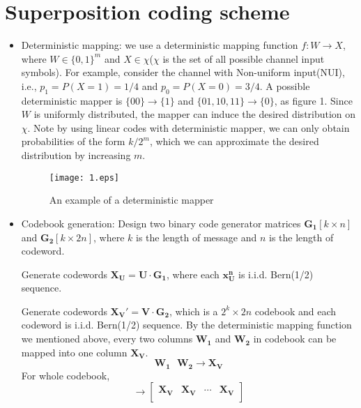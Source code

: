 \documentclass[12]{article}
\begin{document}
\section*{Superposition coding scheme}
\begin{itemize}
	\item Deterministic mapping: we use a deterministic mapping function $f: W\rightarrow X$, 
		where $W\in\{0,1\}^m$ and $X
\in\chi$($\chi$ is the set of all possible channel input symbols). For example, consider the channel with Non-uniform
input(NUI), i.e., $p_1=P(X=1)=1/4$ and $p_0=P(X=0)=3/4$. A possible deterministic mapper is
$\{00\}\rightarrow\{1\}$ and $\{01,10,11\} \rightarrow\{0\}$, as figure 1. Since $W$ is uniformly
distributed, the mapper can induce the desired distribution on $\chi$.
Note by using linear codes with deterministic mapper, we can only obtain probabilities of the form $k/2^m$, which we can
approximate the desired distribution by increasing $m$.\\
  \begin{figure}
\centering
  \texttt{[image: 1.eps]}
 \caption{An example of a deterministic mapper}
\label{1}
\end{figure}
\item Codebook generation: Design two binary code generator matrices $\mathbf{G_1}[k\times n]$ and
$\mathbf{G_2}[k\times 2n]$, where $k$ is the length of message and $n$ is the length of codeword.

Generate codewords $\mathbf{X_U}=\mathbf{U}\cdot \mathbf{G_1}$, where each $\mathbf{x_U^n}$ is i.i.d. Bern(1/2) sequence.

Generate codewords $\mathbf{X_V'}=\mathbf{V}\cdot \mathbf{G_2}$, which is a $2^{k}\times 2n$ codebook and each codeword is
i.i.d. Bern(1/2) sequence. By the deterministic mapping function we mentioned above, every two columns $
\mathbf{W_1}$ and $\mathbf{W_2}$ in codebook can be mapped into one column $\mathbf{X_V}$.
\begin{equation*}
\mathbf{ W_1~~~W_2}\rightarrow\mathbf{ X_V}
\end{equation*}
For whole codebook, 
\begin{equation*}
      [ \begin{array}{ccccccc}
	       \mathbf{W_1} & \mathbf{W_2} & \mathbf{W_1} & \mathbf{W_2} & \cdots & \mathbf{W_1} & \mathbf{W_2} \\
       \end{array}]
     \rightarrow
       [\begin{array}{cccc}
	       \mathbf{X_V} & \mathbf{X_V} & \cdots & \mathbf{X_V} \\
       \end{array}]
\end{equation*}


\end{itemize}
\end{document}
